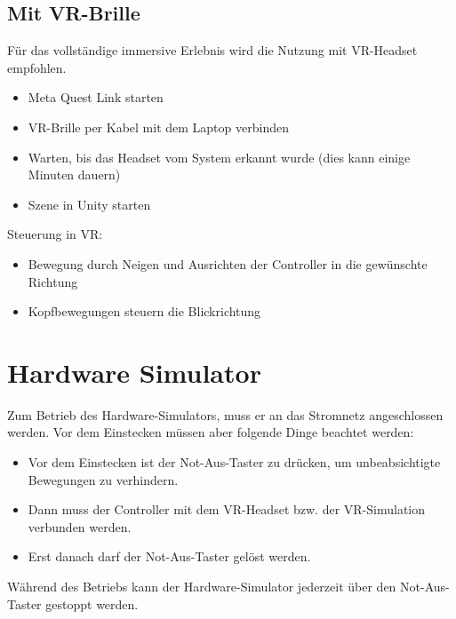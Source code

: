 \subsection{Mit VR-Brille}
Für das vollständige immersive Erlebnis wird die Nutzung mit VR-Headset empfohlen.

\begin{itemize}
    \item Meta Quest Link starten
    \item VR-Brille per Kabel mit dem Laptop verbinden
    \item Warten, bis das Headset vom System erkannt wurde (dies kann einige Minuten dauern)
    \item Szene in Unity starten
\end{itemize}

Steuerung in VR:
\begin{itemize}
    \item Bewegung durch Neigen und Ausrichten der Controller in die gewünschte Richtung
    \item Kopfbewegungen steuern die Blickrichtung
\end{itemize}

\section{Hardware Simulator}
Zum Betrieb des Hardware-Simulators, muss er an das Stromnetz angeschlossen werden. Vor dem Einstecken müssen aber folgende Dinge beachtet werden:

\begin{itemize}
    \item Vor dem Einstecken ist der Not-Aus-Taster zu drücken, um unbeabsichtigte Bewegungen zu verhindern.
    \item Dann muss der Controller mit dem VR-Headset bzw. der VR-Simulation verbunden werden.
    \item Erst danach darf der Not-Aus-Taster gelöst werden.
\end{itemize}

Während des Betriebs kann der Hardware-Simulator jederzeit über den Not-Aus-Taster gestoppt werden.

